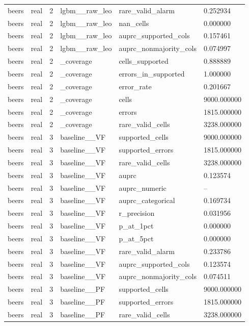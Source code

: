 \begin{tabular}{llllll}
beers & real & 2 & lgbm\_\_raw\_leo & rare\_valid\_alarm & 0.252934 \\
beers & real & 2 & lgbm\_\_raw\_leo & nan\_cells & 0.000000 \\
beers & real & 2 & lgbm\_\_raw\_leo & auprc\_supported\_cols & 0.157461 \\
beers & real & 2 & lgbm\_\_raw\_leo & auprc\_nonmajority\_cols & 0.074997 \\
beers & real & 2 & \_coverage & cells\_supported & 0.888889 \\
beers & real & 2 & \_coverage & errors\_in\_supported & 1.000000 \\
beers & real & 2 & \_coverage & error\_rate & 0.201667 \\
beers & real & 2 & \_coverage & cells & 9000.000000 \\
beers & real & 2 & \_coverage & errors & 1815.000000 \\
beers & real & 2 & \_coverage & rare\_valid\_cells & 3238.000000 \\
beers & real & 3 & baseline\_\_VF & supported\_cells & 9000.000000 \\
beers & real & 3 & baseline\_\_VF & supported\_errors & 1815.000000 \\
beers & real & 3 & baseline\_\_VF & rare\_valid\_cells & 3238.000000 \\
beers & real & 3 & baseline\_\_VF & auprc & 0.123574 \\
beers & real & 3 & baseline\_\_VF & auprc\_numeric & -- \\
beers & real & 3 & baseline\_\_VF & auprc\_categorical & 0.169734 \\
beers & real & 3 & baseline\_\_VF & r\_precision & 0.031956 \\
beers & real & 3 & baseline\_\_VF & p\_at\_1pct & 0.000000 \\
beers & real & 3 & baseline\_\_VF & p\_at\_5pct & 0.000000 \\
beers & real & 3 & baseline\_\_VF & rare\_valid\_alarm & 0.233786 \\
beers & real & 3 & baseline\_\_VF & auprc\_supported\_cols & 0.123574 \\
beers & real & 3 & baseline\_\_VF & auprc\_nonmajority\_cols & 0.074511 \\
beers & real & 3 & baseline\_\_PF & supported\_cells & 9000.000000 \\
beers & real & 3 & baseline\_\_PF & supported\_errors & 1815.000000 \\
beers & real & 3 & baseline\_\_PF & rare\_valid\_cells & 3238.000000 \\

\end{tabular}
